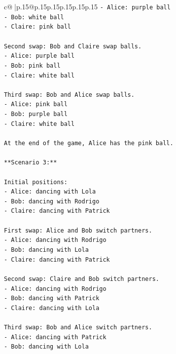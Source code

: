 \documentclass{article}
\begin{document}
{\begin{supertabular}{c@{$\;$}|p{.15\linewidth}@{}p{.15\linewidth}p{.15\linewidth}p{.15\linewidth}p{.15\linewidth}p{.15\linewidth}}
{{{\texttt{{-} Alice: purple ball} \\
\texttt{{-} Bob: white ball} \\
\texttt{{-} Claire: pink ball} \\
\\ 
\texttt{Second swap: Bob and Claire swap balls.} \\
\texttt{{-} Alice: purple ball} \\
\texttt{{-} Bob: pink ball} \\
\texttt{{-} Claire: white ball} \\
\\ 
\texttt{Third swap: Bob and Alice swap balls.} \\
\texttt{{-} Alice: pink ball} \\
\texttt{{-} Bob: purple ball} \\
\texttt{{-} Claire: white ball} \\
\\ 
\texttt{At the end of the game, Alice has the pink ball.} \\
\\ 
\texttt{**Scenario 3:**} \\
\\ 
\texttt{Initial positions:} \\
\texttt{{-} Alice: dancing with Lola} \\
\texttt{{-} Bob: dancing with Rodrigo} \\
\texttt{{-} Claire: dancing with Patrick} \\
\\ 
\texttt{First swap: Alice and Bob switch partners.} \\
\texttt{{-} Alice: dancing with Rodrigo} \\
\texttt{{-} Bob: dancing with Lola} \\
\texttt{{-} Claire: dancing with Patrick} \\
\\ 
\texttt{Second swap: Claire and Bob switch partners.} \\
\texttt{{-} Alice: dancing with Rodrigo} \\
\texttt{{-} Bob: dancing with Patrick} \\
\texttt{{-} Claire: dancing with Lola} \\
\\ 
\texttt{Third swap: Bob and Alice switch partners.} \\
\texttt{{-} Alice: dancing with Patrick} \\
\texttt{{-} Bob: dancing with Lola} \\
}}}
\end{supertabular}}
\end{document}
